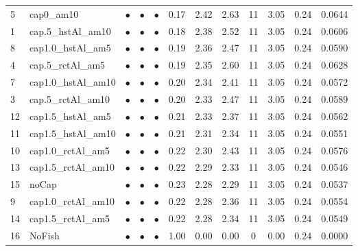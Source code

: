 \documentclass[11pt]{book}
\begin{document}
\begin{turn}
\begin{longtable}[t]{llcccccccccc}
5 & cap0\_am10 & $\bullet$ & $\bullet$ & $\bullet$ & 0.17 & 2.42 & 2.63 & 11 & 3.05 & 0.24 & 0.0644\\
1 & cap.5\_hstAl\_am10 & $\bullet$ & $\bullet$ & $\bullet$ & 0.18 & 2.38 & 2.52 & 11 & 3.05 & 0.24 & 0.0606\\
8 & cap1.0\_hstAl\_am5 & $\bullet$ & $\bullet$ & $\bullet$ & 0.19 & 2.36 & 2.47 & 11 & 3.05 & 0.24 & 0.0590\\
4 & cap.5\_rctAl\_am5 & $\bullet$ & $\bullet$ & $\bullet$ & 0.19 & 2.35 & 2.60 & 11 & 3.05 & 0.24 & 0.0628\\
7 & cap1.0\_hstAl\_am10 & $\bullet$ & $\bullet$ & $\bullet$ & 0.20 & 2.34 & 2.41 & 11 & 3.05 & 0.24 & 0.0572\\
3 & cap.5\_rctAl\_am10 & $\bullet$ & $\bullet$ & $\bullet$ & 0.20 & 2.33 & 2.47 & 11 & 3.05 & 0.24 & 0.0589\\
12 & cap1.5\_hstAl\_am5 & $\bullet$ & $\bullet$ & $\bullet$ & 0.21 & 2.33 & 2.37 & 11 & 3.05 & 0.24 & 0.0562\\
11 & cap1.5\_hstAl\_am10 & $\bullet$ & $\bullet$ & $\bullet$ & 0.21 & 2.31 & 2.34 & 11 & 3.05 & 0.24 & 0.0551\\
10 & cap1.0\_rctAl\_am5 & $\bullet$ & $\bullet$ & $\bullet$ & 0.22 & 2.30 & 2.43 & 11 & 3.05 & 0.24 & 0.0576\\
13 & cap1.5\_rctAl\_am10 & $\bullet$ & $\bullet$ & $\bullet$ & 0.22 & 2.29 & 2.33 & 11 & 3.05 & 0.24 & 0.0546\\
15 & noCap & $\bullet$ & $\bullet$ & $\bullet$ & 0.23 & 2.28 & 2.29 & 11 & 3.05 & 0.24 & 0.0537\\
9 & cap1.0\_rctAl\_am10 & $\bullet$ & $\bullet$ & $\bullet$ & 0.22 & 2.28 & 2.36 & 11 & 3.05 & 0.24 & 0.0554\\
14 & cap1.5\_rctAl\_am5 & $\bullet$ & $\bullet$ & $\bullet$ & 0.22 & 2.28 & 2.34 & 11 & 3.05 & 0.24 & 0.0549\\
16 & NoFish & $\bullet$ & $\bullet$ & $\bullet$ & 1.00 & 0.00 & 0.00 & 0 & 0.00 & 0.24 & 0.0000\\
\bottomrule
\end{longtable}
\endgroup{}
\endgroup{}

\newpage


\end{turn}
\end{document}
